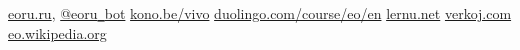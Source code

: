 \documentclass{article}
\begin{document}
\begin{center}
\vspace{0.5em}
\href{http://eoru.ru/}{eoru.ru}, \href{https://t.me/eoru_bot}{@eoru\texttt{\_}bot}
\quad \href{https://kono.be/vivo}{kono.be/vivo}
\quad \href{https://duolingo.com/course/eo/en}{duolingo.com/course/eo/en}
\quad \href{https://lernu.net/}{lernu.net}
\quad \href{https://verkoj.com/}{verkoj.com}
\quad \href{https://eo.wikipedia.org/}{eo.wikipedia.org}

\end{center}
\end{document}
